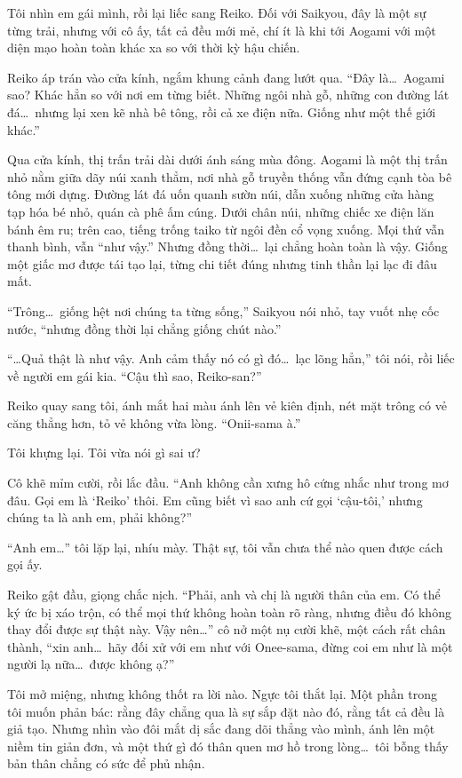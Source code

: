 \documentclass[../main.tex]{subfiles}
\begin{document}
Tôi nhìn em gái mình, rồi lại liếc sang Reiko. Đối với Saikyou, đây là một sự từng trải, nhưng với cô ấy, tất cả đều mới mẻ, chí ít là khi tới Aogami với một diện mạo hoàn toàn khác xa so với thời kỳ hậu chiến.

Reiko áp trán vào cửa kính, ngắm khung cảnh đang lướt qua. ``Đây là\dots\ Aogami sao? Khác hẳn so với nơi em từng biết. Những ngôi nhà gỗ, những con đường lát đá\dots\ nhưng lại xen kẽ nhà bê tông, rồi cả xe điện nữa. Giống như một thế giới khác.''

Qua cửa kính, thị trấn trải dài dưới ánh sáng mùa đông. Aogami là một thị trấn nhỏ nằm giữa dãy núi xanh thẳm, nơi nhà gỗ truyền thống vẫn đứng cạnh tòa bê tông mới dựng. Đường lát đá uốn quanh sườn núi, dẫn xuống những cửa hàng tạp hóa bé nhỏ, quán cà phê ấm cúng. Dưới chân núi, những chiếc xe điện lăn bánh êm ru; trên cao, tiếng trống taiko từ ngôi đền cổ vọng xuống. Mọi thứ vẫn thanh bình, vẫn ``như vậy.'' Nhưng đồng thời\dots\ lại chẳng hoàn toàn là vậy. Giống một giấc mơ được tái tạo lại, từng chi tiết đúng nhưng tinh thần lại lạc đi đâu mất.

``Trông\dots\ giống hệt nơi chúng ta từng sống,'' Saikyou nói nhỏ, tay vuốt nhẹ cốc nước, ``nhưng đồng thời lại chẳng giống chút nào.''

``\dots Quả thật là như vậy. Anh cảm thấy nó có gì đó\dots\ lạc lõng hẳn,'' tôi nói, rồi liếc về người em gái kia. ``Cậu thì sao, Reiko-san?''

Reiko quay sang tôi, ánh mắt hai màu ánh lên vẻ kiên định, nét mặt trông có vẻ căng thẳng hơn, tỏ vẻ không vừa lòng. ``Onii-sama à.''

Tôi khựng lại. Tôi vừa nói gì sai ư?

Cô khẽ mỉm cười, rồi lắc đầu. ``Anh không cần xưng hô cứng nhắc như trong mơ đâu. Gọi em là `Reiko' thôi. Em cũng biết vì sao anh cứ gọi `cậu-tôi,' nhưng chúng ta là anh em, phải không?''

``Anh em\dots'' tôi lặp lại, nhíu mày. Thật sự, tôi vẫn chưa thể nào quen được cách gọi ấy.

Reiko gật đầu, giọng chắc nịch. ``Phải, anh và chị là người thân của em. Có thể ký ức bị xáo trộn, có thể mọi thứ không hoàn toàn rõ ràng, nhưng điều đó không thay đổi được sự thật này. Vậy nên\dots'' cô nở một nụ cười khẽ, một cách rất chân thành, ``xin anh\dots\ hãy đối xử với em như với Onee-sama, đừng coi em như là một người lạ nữa\dots\ được không ạ?''

Tôi mở miệng, nhưng không thốt ra lời nào. Ngực tôi thắt lại. Một phần trong tôi muốn phản bác: rằng đây chẳng qua là sự sắp đặt nào đó, rằng tất cả đều là giả tạo. Nhưng nhìn vào đôi mắt dị sắc đang dõi thẳng vào mình, ánh lên một niềm tin giản đơn, và một thứ gì đó thân quen mơ hồ trong lòng\dots\ tôi bỗng thấy bản thân chẳng có sức để phủ nhận.
\end{document}
